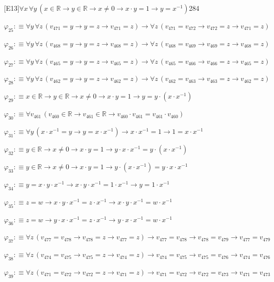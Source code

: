 \begin{fullproof}{[E13]}{$\forall x\,\forall y\,(x \in \mathbb{R} \to y \in \mathbb{R} \to x \neq 0 \to x \cdot y = 1 \to y = x^{-1})$}{284}
\begin{abbrevlist}
\item $\varphi_{25} :\equiv \forall y\,\forall z\,(v_{471} = y \to y = z \to v_{471} = z) \to \forall z\,(v_{471} = v_{472} \to v_{472} = z \to v_{471} = z)$
\item $\varphi_{26} :\equiv \forall y\,\forall z\,(v_{468} = y \to y = z \to v_{468} = z) \to \forall z\,(v_{468} = v_{469} \to v_{469} = z \to v_{468} = z)$
\item $\varphi_{27} :\equiv \forall y\,\forall z\,(v_{465} = y \to y = z \to v_{465} = z) \to \forall z\,(v_{465} = v_{466} \to v_{466} = z \to v_{465} = z)$
\item $\varphi_{28} :\equiv \forall y\,\forall z\,(v_{462} = y \to y = z \to v_{462} = z) \to \forall z\,(v_{462} = v_{463} \to v_{463} = z \to v_{462} = z)$
\item $\varphi_{29} :\equiv x \in \mathbb{R} \to y \in \mathbb{R} \to x \neq 0 \to x \cdot y = 1 \to y = y \cdot (x \cdot x^{-1})$
\item $\varphi_{30} :\equiv \forall v_{461}\,(v_{460} \in \mathbb{R} \to v_{461} \in \mathbb{R} \to v_{460} \cdot v_{461} = v_{461} \cdot v_{460})$
\item $\varphi_{31} :\equiv \forall y\,(x \cdot x^{-1} = y \to y = x \cdot x^{-1}) \to x \cdot x^{-1} = 1 \to 1 = x \cdot x^{-1}$
\item $\varphi_{32} :\equiv y \in \mathbb{R} \to x \neq 0 \to x \cdot y = 1 \to y \cdot x \cdot x^{-1} = y \cdot (x \cdot x^{-1})$
\item $\varphi_{33} :\equiv y \in \mathbb{R} \to x \neq 0 \to x \cdot y = 1 \to y \cdot (x \cdot x^{-1}) = y \cdot x \cdot x^{-1}$
\item $\varphi_{34} :\equiv y = x \cdot y \cdot x^{-1} \to x \cdot y \cdot x^{-1} = 1 \cdot x^{-1} \to y = 1 \cdot x^{-1}$
\item $\varphi_{35} :\equiv z = w \to x \cdot y \cdot x^{-1} = z \cdot x^{-1} \to x \cdot y \cdot x^{-1} = w \cdot x^{-1}$
\item $\varphi_{36} :\equiv z = w \to y \cdot x \cdot x^{-1} = z \cdot x^{-1} \to y \cdot x \cdot x^{-1} = w \cdot x^{-1}$
\item $\varphi_{37} :\equiv \forall z\,(v_{477} = v_{478} \to v_{478} = z \to v_{477} = z) \to v_{477} = v_{478} \to v_{478} = v_{479} \to v_{477} = v_{479}$
\item $\varphi_{38} :\equiv \forall z\,(v_{474} = v_{475} \to v_{475} = z \to v_{474} = z) \to v_{474} = v_{475} \to v_{475} = v_{476} \to v_{474} = v_{476}$
\item $\varphi_{39} :\equiv \forall z\,(v_{471} = v_{472} \to v_{472} = z \to v_{471} = z) \to v_{471} = v_{472} \to v_{472} = v_{473} \to v_{471} = v_{473}$

\end{abbrevlist}
\end{fullproof}
